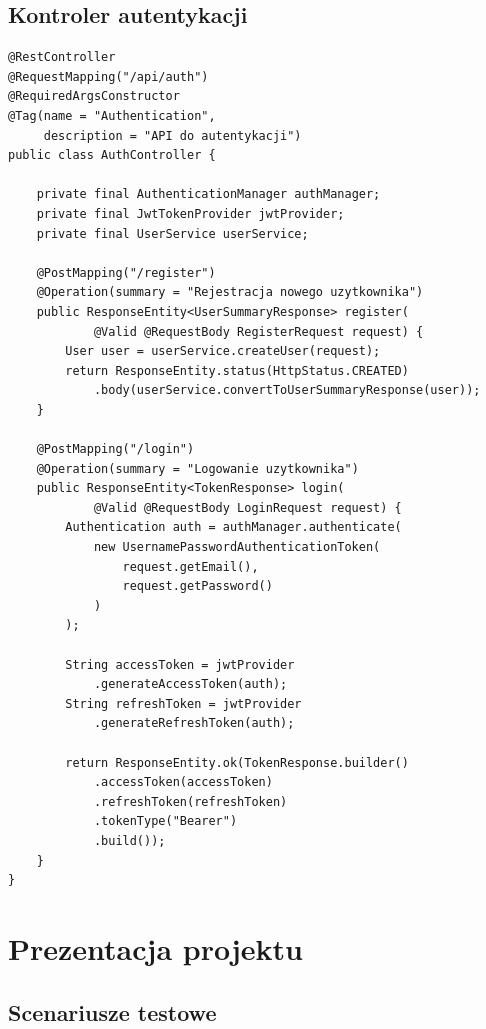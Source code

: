 \documentclass[12pt,a4paper]{report}
\begin{document}
\section{Kontroler autentykacji}

\begin{lstlisting}[style=javastyle, caption={AuthController.java}]
@RestController
@RequestMapping("/api/auth")
@RequiredArgsConstructor
@Tag(name = "Authentication", 
     description = "API do autentykacji")
public class AuthController {

    private final AuthenticationManager authManager;
    private final JwtTokenProvider jwtProvider;
    private final UserService userService;

    @PostMapping("/register")
    @Operation(summary = "Rejestracja nowego uzytkownika")
    public ResponseEntity<UserSummaryResponse> register(
            @Valid @RequestBody RegisterRequest request) {
        User user = userService.createUser(request);
        return ResponseEntity.status(HttpStatus.CREATED)
            .body(userService.convertToUserSummaryResponse(user));
    }

    @PostMapping("/login")
    @Operation(summary = "Logowanie uzytkownika")
    public ResponseEntity<TokenResponse> login(
            @Valid @RequestBody LoginRequest request) {
        Authentication auth = authManager.authenticate(
            new UsernamePasswordAuthenticationToken(
                request.getEmail(), 
                request.getPassword()
            )
        );
        
        String accessToken = jwtProvider
            .generateAccessToken(auth);
        String refreshToken = jwtProvider
            .generateRefreshToken(auth);
        
        return ResponseEntity.ok(TokenResponse.builder()
            .accessToken(accessToken)
            .refreshToken(refreshToken)
            .tokenType("Bearer")
            .build());
    }
}
\end{lstlisting}

\chapter{Prezentacja projektu}

\section{Scenariusze testowe}
\end{document}
